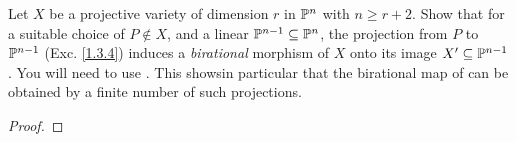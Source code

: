 \label{1.4.9}

Let $X$ be a projective variety of dimension $r$ in $\P^n$ with $n \geq r + 2$. Show that for a suitable choice of $P \notin X$, and a linear $\P^{n - 1} \subseteq \P^n$, the projection from $P$ to $\P^{n - 1}$ (Exc. \ref{1.3.4}) induces a \emph{birational} morphism of $X$ onto its image $X' \subseteq \P^{n - 1}$. You will need to use \cite[I.4.6A, I.4.7A, I.4.8A]{hartshorne}. This showsin particular that the birational map of \cite[I.4.9]{hartshorne} can be obtained by a finite number of such projections.

\begin{proof}

\end{proof}
